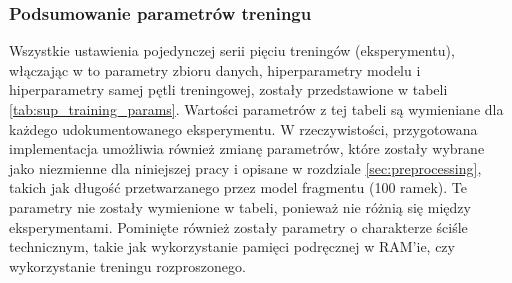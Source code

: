 \subsubsection{Podsumowanie parametrów treningu}

Wszystkie ustawienia pojedynczej serii pięciu treningów (eksperymentu), włączając w to parametry
zbioru danych, hiperparametry modelu i hiperparametry samej pętli treningowej, zostały przedstawione
w tabeli \ref{tab:sup_training_params}. Wartości parametrów z tej tabeli są wymieniane dla każdego
udokumentowanego eksperymentu. W rzeczywistości, przygotowana implementacja umożliwia również zmianę
parametrów, które zostały wybrane jako niezmienne dla niniejszej pracy i opisane w rozdziale
\ref{sec:preprocessing}, takich jak długość przetwarzanego przez model fragmentu (100 ramek). Te
parametry nie zostały wymienione w tabeli, ponieważ nie różnią się między eksperymentami. Pominięte
również zostały parametry o charakterze ściśle technicznym, takie jak wykorzystanie pamięci
podręcznej w RAM'ie, czy wykorzystanie treningu rozproszonego.


